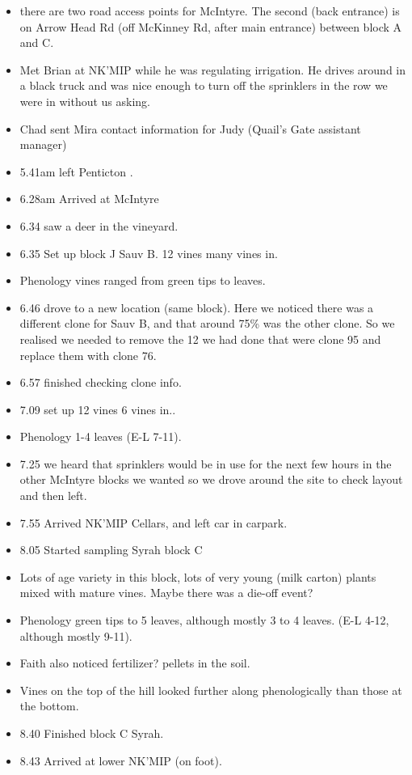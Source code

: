 \documentclass[11pt,letter]{article}
\newenvironment{smitemize}{
\begin{itemize}
  \setlength{\itemsep}{0pt}
  \setlength{\parskip}{0.8pt}
  \setlength{\parsep}{0pt}}
{\end{itemize}
}
\begin{document}
\begin{smitemize}
\item there are two road access points for McIntyre. The second (back entrance) is on Arrow Head Rd (off McKinney Rd, after main entrance) between block A and C.
\item Met Brian at NK'MIP while he was regulating irrigation. He drives around in a black truck and was nice enough to turn off the sprinklers in the row we were in without us asking.
\item Chad sent Mira contact information for Judy (Quail's Gate assistant manager)
\item 5.41am left Penticton .
\item 6.28am Arrived at McIntyre
\item 6.34 saw a deer in the vineyard.
\item 6.35 Set up block J Sauv B. 12 vines many vines in.
\item Phenology vines ranged from green tips to leaves.
\item 6.46 drove to a new location (same block). Here we noticed there was a different clone for Sauv B, and that around 75\% was the other clone. So we realised we needed to remove the 12 we had done that were clone 95 and replace them with clone 76. 
\item 6.57 finished checking clone info.
\item 7.09 set up 12 vines 6 vines in..
\item Phenology 1-4 leaves (E-L 7-11). 
\item 7.25 we heard that sprinklers would be in use for the next few hours in the other McIntyre blocks we wanted so we drove around the site to check layout and then left. 
\item 7.55 Arrived NK'MIP Cellars, and left car in carpark.
\item 8.05 Started sampling Syrah block C
\item Lots of age variety in this block, lots of very young (milk carton) plants mixed with mature vines. Maybe there was a die-off event? 
\item Phenology green tips to 5 leaves, although mostly 3 to 4 leaves. (E-L 4-12, although mostly 9-11).
\item Faith also noticed fertilizer? pellets in the soil. 
\item Vines on the top of the hill looked further along phenologically than those at the bottom.
\item 8.40 Finished block C Syrah.
\item 8.43 Arrived at lower NK'MIP (on foot).

\end{smitemize}
\end{document}
